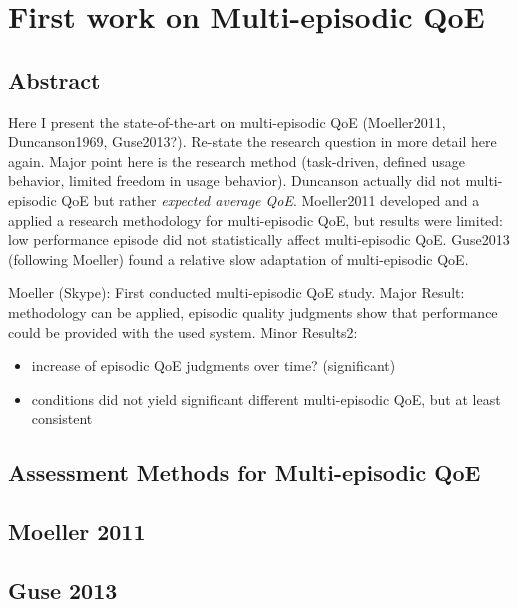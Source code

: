 \chapter{First work on Multi-episodic QoE}\label{chap:05} %
\section*{Abstract}

Here I present the state-of-the-art on multi-episodic QoE (Moeller2011, Duncanson1969, Guse2013?).
Re-state the research question in more detail here again.
Major point here is the research method (task-driven, defined usage behavior, limited freedom in usage behavior).
Duncanson actually did not multi-episodic QoE but rather \textit{expected average QoE}.
Moeller2011 developed and a applied a research methodology for multi-episodic QoE, but results were limited: low performance episode did not statistically affect multi-episodic QoE.
Guse2013 (following Moeller) found a relative slow adaptation of multi-episodic QoE.


Moeller (Skype): First conducted multi-episodic QoE study.
Major Result: methodology can be applied, episodic quality judgments show that performance could be provided with the used system.
Minor Results2: 
\begin{itemize}
\item increase of episodic QoE judgments over time? (significant)
\item conditions did not yield significant different multi-episodic QoE, but at least consistent
\end{itemize}

\section{Assessment Methods for Multi-episodic QoE}


\section{Moeller 2011}

\section{Guse 2013}